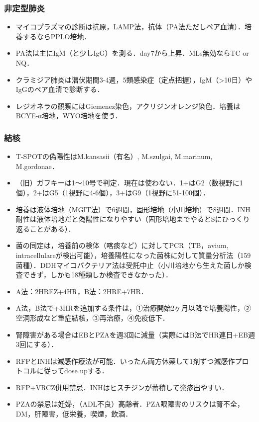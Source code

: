 \subsubsection{非定型肺炎}

\begin{itemize}
\item マイコプラズマの診断は抗原，LAMP法，抗体（PA法ただしペア血清）．培養するならPPLO培地．
\item PA法は主にIgM（と少しIgG）を測る．day7から上昇．MLs無効ならTC or NQ．
\item クラミジア肺炎は潜伏期間3-4週，5類感染症（定点把握），IgM（>10日）やIgGのペア血清で診断する．
\item レジオネラの観察にはGiemenez染色，アクリジンオレンジ染色．培養はBCYE-α培地，WYO培地を使う．
\end{itemize}


\subsubsection{結核}

\begin{itemize}
\item T-SPOTの偽陽性はM.kansasii（有名）, M.szulgai, M.marinum, M.gordonae．
\item （旧）ガフキーは1〜10号で判定．現在は使わない．1+はG2（数視野に1個），2+はG5（1視野に4-6個），3+はG9（1視野に51-100個）．
\item 培養は液体培地（MGIT法）で6週間，固形培地（小川培地）で8週間．INH耐性は液体培地だと偽陽性になりやすい（固形培地までやるとSにひっくり返ることがある）．
\item 菌の同定は，培養前の検体（喀痰など）に対してPCR（TB，avium, intracellulareが検出可能），培養陽性になった菌株に対して質量分析法（159菌種）．DDHマイコバクテリア法は受託中止（小川培地から生えた菌しか検査できず，しかも18種類しか検査できなかった）．
\item A法：2HREZ+4HR，B法：2HRE+7HR．
\item A法，B法で+3HRを追加する条件は，①治療開始2ヶ月以降で培養陽性，②空洞形成など重症結核，③再治療，④免疫低下．
\item 腎障害がある場合はEBとPZAを週3回に減量（実際にはB法でHR連日+EB週3回にする）．
\item RFPとINHは減感作療法が可能．いったん両方休薬して1剤ずつ減感作プロトコルに従ってdose upする．
\item RFP+VRCZ併用禁忌．INHはヒスチジンが蓄積して発疹出やすい．
\item PZAの禁忌は妊婦，（ADL不良）高齢者．PZA眼障害のリスクは腎不全，DM，肝障害，低栄養，喫煙，飲酒．
\end{itemize}


